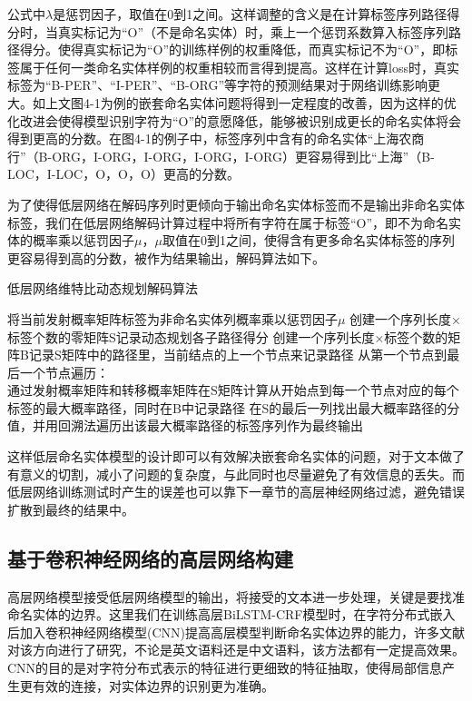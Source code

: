 \documentclass[winfonts,master,oneside,nobackinfo]{njuthesis}
\begin{document}
公式中$\lambda$是惩罚因子，取值在0到1之间。这样调整的含义是在计算标签序列路径得分时，当真实标记为“O”（不是命名实体）时，乘上一个惩罚系数算入标签序列路径得分。使得真实标记为“O”的训练样例的权重降低，而真实标记不为“O”，即标签属于任何一类命名实体样例的权重相较而言得到提高。这样在计算loss时，真实标签为“B-PER”、“I-PER”、“B-ORG”等字符的预测结果对于网络训练影响更大。如上文图4-1为例的嵌套命名实体问题将得到一定程度的改善，因为这样的优化改进会使得模型识别字符为“O”的意愿降低，能够被识别成更长的命名实体将会得到更高的分数。在图4-1的例子中，标签序列中含有的命名实体“上海农商行”（B-ORG，I-ORG，I-ORG，I-ORG，I-ORG）更容易得到比“上海”（B-LOC，I-LOC，O，O，O）更高的分数。

为了使得低层网络在解码序列时更倾向于输出命名实体标签而不是输出非命名实体标签，我们在低层网络解码计算过程中将所有字符在属于标签“O”，即不为命名实体的概率乘以惩罚因子$\mu$，$\mu$取值在0到1之间，使得含有更多命名实体标签的序列更容易得到高的分数，被作为结果输出，解码算法如下。

\begin{algorithm}[H]
    \caption{低层网络维特比动态规划解码算法}
    \label{alg1}
    \begin{algorithmic}[1]
		\STATE 将当前发射概率矩阵标签为非命名实体列概率乘以惩罚因子$\mu$
        \STATE 创建一个序列长度×标签个数的零矩阵S记录动态规划各子路径得分
        \STATE 创建一个序列长度×标签个数的矩阵B记录S矩阵中的路径里，当前结点的上一个节点来记录路径
        \STATE 从第一个节点到最后一个节点遍历： \\
		通过发射概率矩阵和转移概率矩阵在S矩阵计算从开始点到每一个节点对应的每个标签的最大概率路径，同时在B中记录路径
		\STATE 在S的最后一列找出最大概率路径的分值，并用回溯法遍历出该最大概率路径的标签序列作为最终输出
    \end{algorithmic}
\end{algorithm}

这样低层命名实体模型的设计即可以有效解决嵌套命名实体的问题，对于文本做了有意义的切割，减小了问题的复杂度，与此同时也尽量避免了有效信息的丢失。而低层网络训练测试时产生的误差也可以靠下一章节的高层神经网络过滤，避免错误扩散到最终的结果中。

\subsection{基于卷积神经网络的高层网络构建}

高层网络模型接受低层网络模型的输出，将接受的文本进一步处理，关键是要找准命名实体的边界。这里我们在训练高层BiLSTM-CRF模型时，在字符分布式嵌入后加入卷积神经网络模型(CNN)提高高层模型判断命名实体边界的能力\cite{Ma}\cite{kang}，许多文献对该方向进行了研究，不论是英文语料\cite{Zenan}还是中文语料\cite{Yaozong}，该方法都有一定提高效果。CNN的目的是对字符分布式表示的特征进行更细致的特征抽取，使得局部信息产生更有效的连接，对实体边界的识别更为准确。
\end{document}
